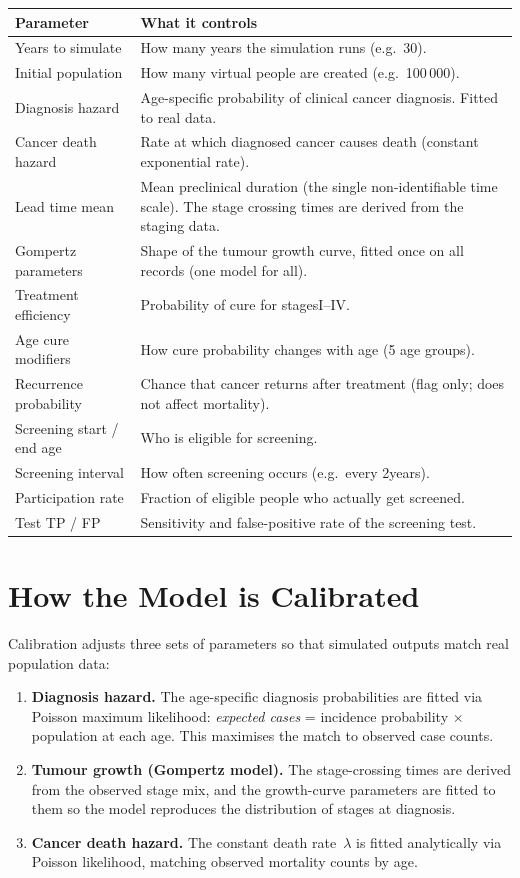 \documentclass[12pt,a4paper]{article}
\begin{document}
\begin{center}
\begin{tabularx}{\textwidth}{@{} l X @{}}
\toprule
\textbf{Parameter} & \textbf{What it controls} \\
\midrule
Years to simulate & How many years the simulation runs (e.g.\ 30). \\
Initial population & How many virtual people are created (e.g.\ 100\,000). \\
Diagnosis hazard & Age-specific probability of clinical cancer diagnosis. Fitted to real data. \\
Cancer death hazard & Rate at which diagnosed cancer causes death (constant exponential rate). \\
Lead time mean & Mean preclinical duration (the single non-identifiable time scale). The stage crossing times are derived from the staging data. \\
Gompertz parameters & Shape of the tumour growth curve, fitted once on all records (one model for all). \\
Treatment efficiency & Probability of cure for stages\;I--IV. \\
Age cure modifiers & How cure probability changes with age (5 age groups). \\
Recurrence probability & Chance that cancer returns after treatment (flag only; does not affect mortality). \\
Screening start / end age & Who is eligible for screening. \\
Screening interval & How often screening occurs (e.g.\ every 2\;years). \\
Participation rate & Fraction of eligible people who actually get screened. \\
Test TP / FP & Sensitivity and false-positive rate of the screening test. \\
\bottomrule
\end{tabularx}
\end{center}

\section{How the Model is Calibrated}

Calibration adjusts three sets of parameters so that simulated outputs match real population data:

\begin{enumerate}[nosep]
    \item \textbf{Diagnosis hazard.} The age-specific diagnosis probabilities are fitted via Poisson maximum likelihood: \textit{expected cases} = incidence probability $\times$ population at each age. This maximises the match to observed case counts.
    \item \textbf{Tumour growth (Gompertz model).} The stage-crossing times are derived from the observed stage mix, and the growth-curve parameters are fitted to them so the model reproduces the distribution of stages at diagnosis.
    \item \textbf{Cancer death hazard.} The constant death rate~$\lambda$ is fitted analytically via Poisson likelihood, matching observed mortality counts by age.
\end{enumerate}
\end{document}
